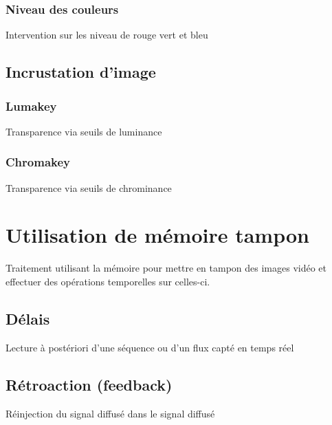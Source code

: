 \documentclass[
  french,
]{book}
\begin{document}
\hypertarget{niveau-des-couleurs}{%
\subsubsection{Niveau des couleurs}\label{niveau-des-couleurs}}

Intervention sur les niveau de rouge vert et bleu

\hypertarget{incrustation-dimage}{%
\subsection{Incrustation d'image}\label{incrustation-dimage}}

\hypertarget{lumakey}{%
\subsubsection{Lumakey}\label{lumakey}}

Transparence via seuils de luminance

\hypertarget{chromakey}{%
\subsubsection{Chromakey}\label{chromakey}}

Transparence via seuils de chrominance

\hypertarget{utilisation-de-muxe9moire-tampon}{%
\section{Utilisation de mémoire tampon}\label{utilisation-de-muxe9moire-tampon}}

Traitement utilisant la mémoire pour mettre en tampon des images vidéo et effectuer des opérations temporelles sur celles-ci.

\hypertarget{duxe9lais}{%
\subsection{Délais}\label{duxe9lais}}

Lecture à postériori d'une séquence ou d'un flux capté en temps réel

\hypertarget{ruxe9troaction-feedback}{%
\subsection{Rétroaction (feedback)}\label{ruxe9troaction-feedback}}

Réinjection du signal diffusé dans le signal diffusé
\end{document}
